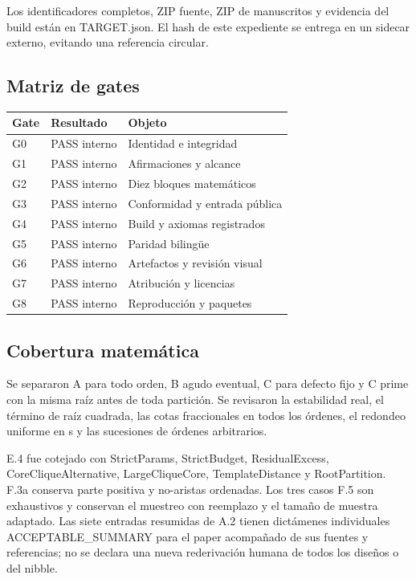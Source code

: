 Los identificadores completos, ZIP fuente, ZIP de manuscritos y
evidencia del build están en TARGET.json. El hash de este expediente se
entrega en un sidecar externo, evitando una referencia circular.

\subsection{Matriz de gates}\label{matriz-de-gates}

{\def\LTcaptype{none} %
\begin{longtable}[]{@{}lll@{}}
\toprule\noalign{}
Gate & Resultado & Objeto \\
\midrule\noalign{}
\endhead
\bottomrule\noalign{}
\endlastfoot
G0 & PASS interno & Identidad e integridad \\
G1 & PASS interno & Afirmaciones y alcance \\
G2 & PASS interno & Diez bloques matemáticos \\
G3 & PASS interno & Conformidad y entrada pública \\
G4 & PASS interno & Build y axiomas registrados \\
G5 & PASS interno & Paridad bilingüe \\
G6 & PASS interno & Artefactos y revisión visual \\
G7 & PASS interno & Atribución y licencias \\
G8 & PASS interno & Reproducción y paquetes \\
\end{longtable}
}

\subsection{Cobertura matemática}\label{cobertura-matemuxe1tica}

Se separaron A para todo orden, B agudo eventual, C para defecto fijo y
C prime con la misma raíz antes de toda partición. Se revisaron la
estabilidad real, el término de raíz cuadrada, las cotas fraccionales en
todos los órdenes, el redondeo uniforme en s y las sucesiones de órdenes
arbitrarios.

E.4 fue cotejado con StrictParams, StrictBudget, ResidualExcess,
CoreCliqueAlternative, LargeCliqueCore, TemplateDistance y
RootPartition. F.3a conserva parte positiva y no-aristas ordenadas. Los
tres casos F.5 son exhaustivos y conservan el muestreo con reemplazo y
el tamaño de muestra adaptado. Las siete entradas resumidas de A.2
tienen dictámenes individuales ACCEPTABLE\_SUMMARY para el paper
acompañado de sus fuentes y referencias; no se declara una nueva
rederivación humana de todos los diseños o del nibble.

